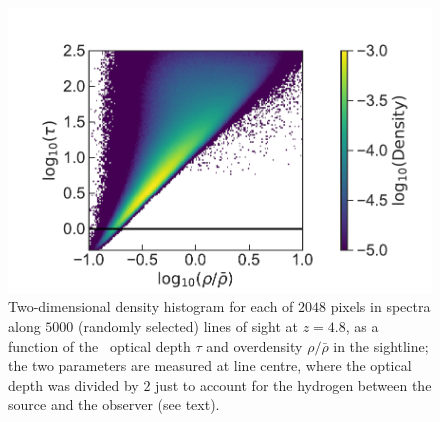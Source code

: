 \begin{figure}
    \centering
    \includegraphics[width=\columnwidth]{"Plots/ChapterP/Optical_depths"}
    \caption[2D histogram of \lya\ optical depth $\tau$ and overdensity $\rho/\bar{\rho}$ at $z=4.8$]{Two-dimensional density histogram for each of $2048$ pixels in spectra along $5000$ (randomly selected) lines of sight at $z=4.8$, as a function of the \lya\ optical depth $\tau$ and overdensity $\rho/\bar{\rho}$ in the sightline; the two parameters are measured at line centre, where the optical depth was divided by $2$ just to account for the hydrogen between the source and the observer (see text).}
    \label{appPfig:2D scatter}
\end{figure}
